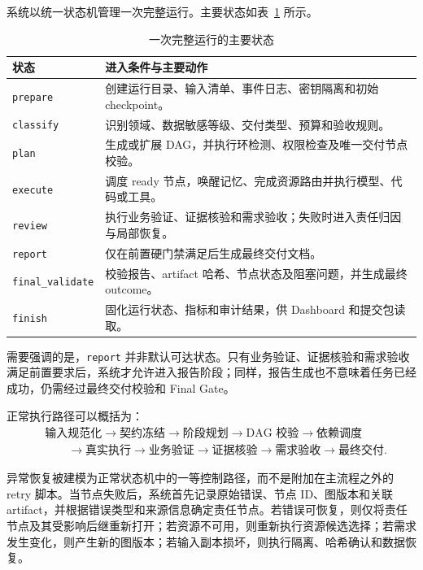 \documentclass[UTF8,a4paper,12pt,oneside]{ctexbook}
\begin{document}
系统以统一状态机管理一次完整运行。主要状态如表~\ref{tab:run-state-machine} 所示。

\begin{table}[htbp]
\centering
\caption{一次完整运行的主要状态}
\label{tab:run-state-machine}
\begin{tabularx}{0.94\textwidth}{p{}X}
\toprule
状态 & 进入条件与主要动作\\
\midrule
\texttt{prepare}
& 创建运行目录、输入清单、事件日志、密钥隔离和初始 checkpoint。\\

\texttt{classify}
& 识别领域、数据敏感等级、交付类型、预算和验收规则。\\

\texttt{plan}
& 生成或扩展 DAG，并执行环检测、权限检查及唯一交付节点校验。\\

\texttt{execute}
& 调度 ready 节点，唤醒记忆、完成资源路由并执行模型、代码或工具。\\

\texttt{review}
& 执行业务验证、证据核验和需求验收；失败时进入责任归因与局部恢复。\\

\texttt{report}
& 仅在前置硬门禁满足后生成最终交付文档。\\

\texttt{final\_validate}
& 校验报告、artifact 哈希、节点状态及阻塞问题，并生成最终 outcome。\\

\texttt{finish}
& 固化运行状态、指标和审计结果，供 Dashboard 和提交包读取。\\
\bottomrule
\end{tabularx}
\end{table}

需要强调的是，\texttt{report} 并非默认可达状态。只有业务验证、证据核验和需求验收满足前置要求后，系统才允许进入报告阶段；同样，报告生成也不意味着任务已经成功，仍需经过最终交付校验和 Final Gate。

正常执行路径可以概括为：
\[
\begin{aligned}
&\text{输入规范化}
\rightarrow \text{契约冻结}
\rightarrow \text{阶段规划}
\rightarrow \text{DAG 校验}
\rightarrow \text{依赖调度} \\[3pt]
&\qquad\rightarrow \text{真实执行}
\rightarrow \text{业务验证}
\rightarrow \text{证据核验}
\rightarrow \text{需求验收}
\rightarrow \text{最终交付}.
\end{aligned}
\]

异常恢复被建模为正常状态机中的一等控制路径，而不是附加在主流程之外的 retry 脚本。当节点失败后，系统首先记录原始错误、节点 ID、图版本和关联 artifact，并根据错误类型和来源信息确定责任节点。若错误可恢复，则仅将责任节点及其受影响后继重新打开；若资源不可用，则重新执行资源候选选择；若需求发生变化，则产生新的图版本；若输入副本损坏，则执行隔离、哈希确认和数据恢复。
\end{document}
